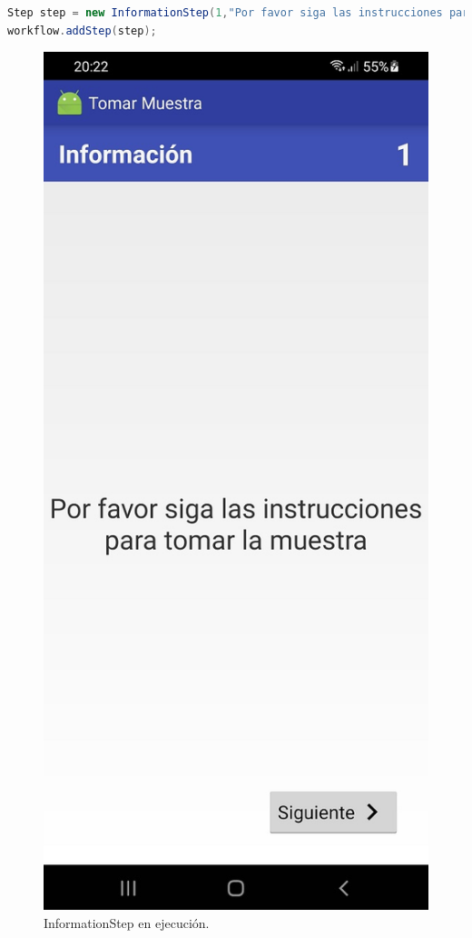 \begin{lstlisting}[language=Java, frame=tlbr, caption=InformationStep en Java.]	
Step step = new InformationStep(1,"Por favor siga las instrucciones para tomar la muestra",2);
workflow.addStep(step);
\end{lstlisting}


\begin{figure}[H]
  \centering
    \includegraphics[scale=0.3]{50-anexos/C-steps/information_screen.jpg} 
    \caption{InformationStep en ejecución.}
\end{figure}


